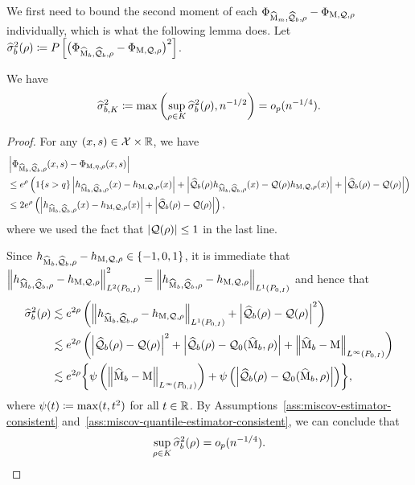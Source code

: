 We first need to bound the second moment of each $\Phi_{\widehat{\operatorname*{M}}_m, \widehat{\mathcal{Q}}_b, \rho} - \Phi_{\operatorname*{M},  \mathcal{Q}, \rho}$ individually, which is what the following lemma does.
Let $\widehat{\sigma}_b^2(\rho) \coloneqq  P\left[ \big( \Phi_{\widehat{\operatorname*{M}}_b, \widehat{\mathcal{Q}}_b, \rho} - \Phi_{\operatorname*{M},  \mathcal{Q}, \rho} \big)^2 \right]$. 
\begin{lemma}
\label{lem:uniform-second-moment}
We have
\begin{align*}
\widehat{\sigma}_{b,K}^2 \coloneqq \max\left( \sup_{\rho \in K} \widehat{\sigma}^2_b(\rho), n^{-1/2} \right) = o_p(n^{-1/4}).
\end{align*}
\end{lemma}
\begin{proof}
For any $(x, s) \in \mathcal{X} \times \mathbb{R}$, we have
\begin{align*}
&\left| \Phi_{\widehat{\operatorname*{M}}_b, \widehat{\mathcal{Q}}_b, \rho}(x,s) - \Phi_{\operatorname*{M},  \eta, \rho}(x,s)  \right| \\
&\le e^\rho \left( 1\!\left\{ s > q\right\} \left| h_{\widehat{\operatorname*{M}}_b, \widehat{\mathcal{Q}}_b, \rho}(x) - h_{\operatorname*{M}, \mathcal{Q}, \rho}(x) \right| 
+ \left|\widehat{\mathcal{Q}}_b(\rho)h_{\widehat{\operatorname*{M}}_b, \widehat{\mathcal{Q}}_b, \rho}(x) - \mathcal{Q}(\rho) h_{\operatorname*{M}, \mathcal{Q}, \rho}(x)\right| + \left| \widehat{\mathcal{Q}}_b(\rho) - \mathcal{Q}(\rho)\right| \right) \\
&\le 2e^\rho \left( \left| h_{\widehat{\operatorname*{M}}_b, \widehat{\mathcal{Q}}_b, \rho}(x) - h_{\operatorname*{M}, \mathcal{Q}, \rho}(x) \right|  + \left| \widehat{\mathcal{Q}}_b(\rho) - \mathcal{Q}(\rho) \right|  \right),
\end{align*}
where we used the fact that $\left| \mathcal{Q}(\rho) \right| \le 1$ in the last line.

Since $h_{\widehat{\operatorname*{M}}_b, \widehat{\mathcal{Q}}_b, \rho} - h_{\operatorname*{M}, \mathcal{Q}, \rho} \in \{-1, 0,1\}$, it is immediate that $\left\|{ h_{\widehat{\operatorname*{M}}_b, \widehat{\mathcal{Q}}_b, \rho} - h_{\operatorname*{M}, \mathcal{Q}, \rho}}\right\|_{L^2(P_{0,I})}^2= \left\|{ h_{\widehat{\operatorname*{M}}_b, \widehat{\mathcal{Q}}_b, \rho} - h_{\operatorname*{M}, \mathcal{Q}, \rho}}\right\|_{L^1(P_{0,I})}$ and hence that
\begin{align*}
\widehat{\sigma}_b^2(\rho) &\lesssim e^{2\rho} \left( \left\|{ h_{\widehat{\operatorname*{M}}_b, \widehat{\mathcal{Q}}_b, \rho} - h_{\operatorname*{M}, \mathcal{Q}, \rho}}\right\|_{L^1(P_{0,I})} + \left| \widehat{\mathcal{Q}}_b(\rho) - \mathcal{Q}(\rho) \right|^2 
\right) \\
&\lesssim e^{2\rho} \left( \left| \widehat{\mathcal{Q}}_b(\rho) - \mathcal{Q}(\rho) \right|^2  + \left| \widehat{\mathcal{Q}}_b(\rho) - \mathcal{Q}_0(\widehat{\operatorname*{M}}_b, \rho) \right| + \left\|{\widehat{\operatorname*{M}}_b - \operatorname*{M}}\right\|_{L^\infty(P_{0,I})} \right) \\
&\lesssim e^{2\rho} \biggr\{ \psi\left( \left\|{\widehat{\operatorname*{M}}_b - \operatorname*{M}}\right\|_{L^\infty(P_{0,I})} \right) +  \psi\left( \left|\widehat{\mathcal{Q}}_b(\rho) - \mathcal{Q}_0(\widehat{\operatorname*{M}}_b, \rho) \right| \right) \biggr\},
\end{align*}
where $\psi(t) \coloneqq \max(t,t^2)$ for all $t \in \mathbb{R}$.
By Assumptions~\ref{ass:miscov-estimator-consistent} and~\ref{ass:miscov-quantile-estimator-consistent}, we can conclude that
\begin{align*}
\sup_{\rho \in K} \widehat{\sigma}_b^2(\rho) = o_p(n^{-1/4}).
\end{align*}
\end{proof}
